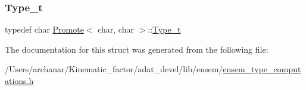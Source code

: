 \subsubsection{\texorpdfstring{Type\_t}{Type\_t}\hspace{0.1cm}{\footnotesize\ttfamily [2/2]}}
{\footnotesize\ttfamily typedef char \mbox{\hyperlink{structPromote}{Promote}}$<$ char, char $>$\+::\mbox{\hyperlink{structPromote_3_01char_00_01char_01_4_abf9ddff19f7af67343d88997bbe4d874}{Type\+\_\+t}}}



The documentation for this struct was generated from the following file\+:\begin{DoxyCompactItemize}
\item 
/\+Users/archanar/\+Kinematic\+\_\+factor/adat\+\_\+devel/lib/ensem/\mbox{\hyperlink{lib_2ensem_2ensem__type__computations_8h}{ensem\+\_\+type\+\_\+computations.\+h}}\end{DoxyCompactItemize}
